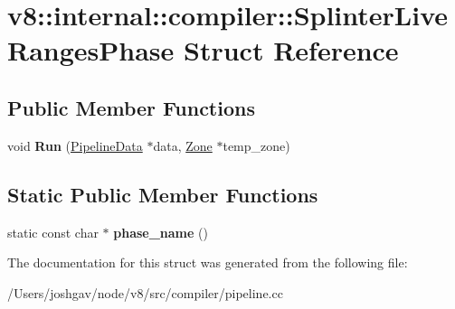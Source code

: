 \hypertarget{structv8_1_1internal_1_1compiler_1_1_splinter_live_ranges_phase}{}\section{v8\+:\+:internal\+:\+:compiler\+:\+:Splinter\+Live\+Ranges\+Phase Struct Reference}
\label{structv8_1_1internal_1_1compiler_1_1_splinter_live_ranges_phase}
\subsection*{Public Member Functions}
\begin{DoxyCompactItemize}
\item 
void {\bfseries Run} (\hyperlink{classv8_1_1internal_1_1compiler_1_1_pipeline_data}{Pipeline\+Data} $\ast$data, \hyperlink{classv8_1_1internal_1_1_zone}{Zone} $\ast$temp\+\_\+zone)\hypertarget{structv8_1_1internal_1_1compiler_1_1_splinter_live_ranges_phase_a890aaa9399d06fd8669b80f8fe8ea14a}{}\label{structv8_1_1internal_1_1compiler_1_1_splinter_live_ranges_phase_a890aaa9399d06fd8669b80f8fe8ea14a}

\end{DoxyCompactItemize}
\subsection*{Static Public Member Functions}
\begin{DoxyCompactItemize}
\item 
static const char $\ast$ {\bfseries phase\+\_\+name} ()\hypertarget{structv8_1_1internal_1_1compiler_1_1_splinter_live_ranges_phase_a396b880ea09360fc1fc1277814833c9f}{}\label{structv8_1_1internal_1_1compiler_1_1_splinter_live_ranges_phase_a396b880ea09360fc1fc1277814833c9f}

\end{DoxyCompactItemize}


The documentation for this struct was generated from the following file\+:\begin{DoxyCompactItemize}
\item 
/\+Users/joshgav/node/v8/src/compiler/pipeline.\+cc\end{DoxyCompactItemize}
